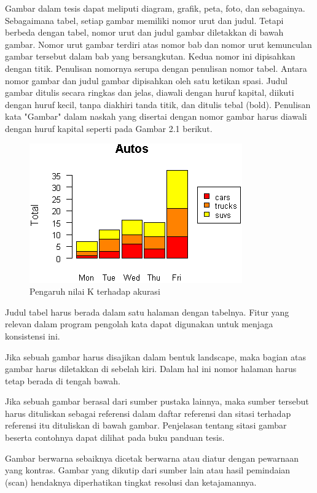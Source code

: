 Gambar dalam tesis dapat meliputi diagram, grafik, peta, foto, dan sebagainya. Sebagaimana tabel, setiap gambar memiliki nomor urut dan judul. Tetapi berbeda dengan tabel, nomor urut dan judul gambar diletakkan di bawah gambar. Nomor urut gambar terdiri atas nomor bab dan nomor urut kemunculan gambar tersebut dalam bab yang bersangkutan. Kedua nomor ini dipisahkan dengan titik. Penulisan nomornya serupa dengan penulisan nomor tabel. Antara nomor gambar dan judul gambar dipisahkan oleh satu ketikan spasi. Judul gambar ditulis secara ringkas dan jelas, diawali dengan huruf kapital, diikuti dengan huruf kecil, tanpa diakhiri tanda titik, dan ditulis tebal (bold). Penulisan kata "Gambar" dalam naskah yang disertai dengan nomor gambar harus diawali dengan huruf kapital seperti pada Gambar  2.1 berikut. 

\begin{figure}[ht]
  \centering
  \includegraphics[width=.5\textwidth]{babs/images/bar_script4.png}
  \caption{Pengaruh nilai K terhadap akurasi}
  \label{fig:pengaruh}
\end{figure}


Judul tabel harus berada dalam satu halaman dengan tabelnya. Fitur yang relevan dalam program pengolah kata dapat digunakan untuk menjaga konsistensi ini.

Jika sebuah gambar harus disajikan dalam bentuk landscape, maka bagian atas gambar harus diletakkan di sebelah kiri. Dalam hal ini nomor halaman harus tetap berada di tengah bawah.   

Jika sebuah gambar berasal dari sumber pustaka lainnya, maka sumber tersebut harus dituliskan sebagai referensi dalam daftar referensi dan sitasi terhadap referensi itu dituliskan di bawah gambar. Penjelasan tentang sitasi gambar beserta contohnya dapat dilihat pada buku panduan tesis. 

Gambar berwarna sebaiknya dicetak berwarna atau diatur dengan pewarnaan yang kontras. Gambar yang dikutip dari sumber lain atau hasil pemindaian (scan) hendaknya diperhatikan tingkat resolusi dan ketajamannya.  

